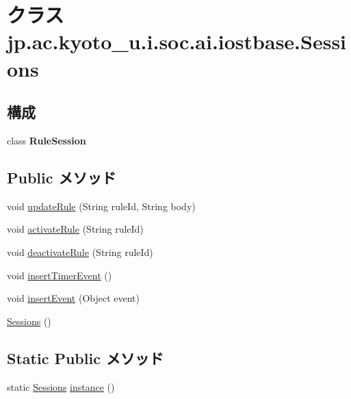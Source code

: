 \hypertarget{classjp_1_1ac_1_1kyoto__u_1_1i_1_1soc_1_1ai_1_1iostbase_1_1_sessions}{\section{クラス jp.\-ac.\-kyoto\-\_\-u.\-i.\-soc.\-ai.\-iostbase.\-Sessions}
\label{classjp_1_1ac_1_1kyoto__u_1_1i_1_1soc_1_1ai_1_1iostbase_1_1_sessions}
}
\subsection*{構成}
\begin{DoxyCompactItemize}
\item 
class {\bfseries Rule\-Session}
\end{DoxyCompactItemize}
\subsection*{Public メソッド}
\begin{DoxyCompactItemize}
\item 
void \hyperlink{classjp_1_1ac_1_1kyoto__u_1_1i_1_1soc_1_1ai_1_1iostbase_1_1_sessions_ae2333821be9a62bb3449aca768a03990}{update\-Rule} (String rule\-Id, String body)
\item 
void \hyperlink{classjp_1_1ac_1_1kyoto__u_1_1i_1_1soc_1_1ai_1_1iostbase_1_1_sessions_a311c43a15e75745acd6fb821937c5c76}{activate\-Rule} (String rule\-Id)
\item 
void \hyperlink{classjp_1_1ac_1_1kyoto__u_1_1i_1_1soc_1_1ai_1_1iostbase_1_1_sessions_a1cefce9b9131c04c95b5c8ec1b2922d1}{deactivate\-Rule} (String rule\-Id)
\item 
void \hyperlink{classjp_1_1ac_1_1kyoto__u_1_1i_1_1soc_1_1ai_1_1iostbase_1_1_sessions_ade4d92ad38185a5cc7b44f0aca7cf28a}{insert\-Timer\-Event} ()
\item 
void \hyperlink{classjp_1_1ac_1_1kyoto__u_1_1i_1_1soc_1_1ai_1_1iostbase_1_1_sessions_a18128a1575d002037ee7dc74da94815b}{insert\-Event} (Object event)
\item 
\hyperlink{classjp_1_1ac_1_1kyoto__u_1_1i_1_1soc_1_1ai_1_1iostbase_1_1_sessions_a12ed2608c67def8c652ad4cb4ec17c0b}{Sessions} ()
\end{DoxyCompactItemize}
\subsection*{Static Public メソッド}
\begin{DoxyCompactItemize}
\item 
static \hyperlink{classjp_1_1ac_1_1kyoto__u_1_1i_1_1soc_1_1ai_1_1iostbase_1_1_sessions}{Sessions} \hyperlink{classjp_1_1ac_1_1kyoto__u_1_1i_1_1soc_1_1ai_1_1iostbase_1_1_sessions_a4cff05f3811f4d2f2feaaa7224e7e966}{instance} ()
\end{DoxyCompactItemize}


